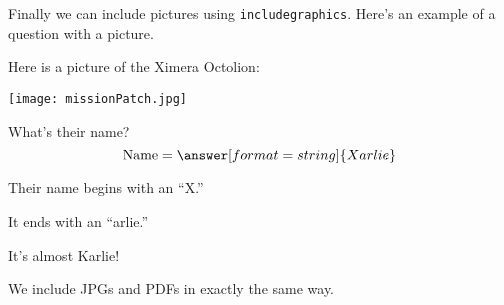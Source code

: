\documentclass{ximera}
\begin{document}
Finally we can include pictures using \verb|includegraphics|. Here's an example of a question with a picture.
\begin{question}
    Here is a picture of the Ximera Octolion:
    \begin{center}
        \texttt{[image: missionPatch.jpg]}
    \end{center}
    What's their name?
    \[
    \text{Name} = \answer[format=string]{Xarlie}
    \]
    \begin{hint}
        Their name begins with an ``X.''
    \end{hint}
    \begin{hint}
        It ends with an ``arlie.''
    \end{hint}
    \begin{hint}
        It's almost Karlie!
    \end{hint}
\end{question}

We include JPGs and PDFs in exactly the same way.
\begin{image}
  \end{image}
\end{document}
